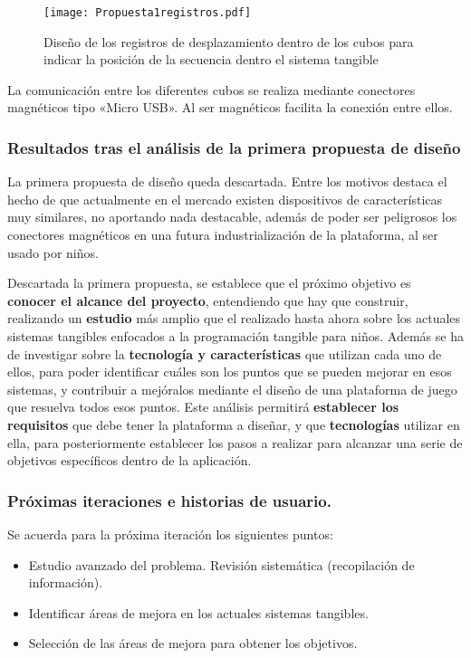 \begin{figure}[!h]
\begin{center}
\texttt{[image: Propuesta1registros.pdf]}
\caption{Diseño de los registros de desplazamiento dentro de los cubos para indicar la posición de la secuencia dentro el sistema tangible}
\label{fig:Propuesta1registros}
\end{center}
\end{figure}

La comunicación entre los diferentes cubos se realiza mediante conectores magnéticos tipo «Micro USB». Al ser magnéticos facilita la conexión entre ellos.

\subsubsection{Resultados tras el análisis de la primera propuesta de diseño}

La primera propuesta de diseño queda descartada. Entre los motivos destaca el hecho de que actualmente en el mercado existen dispositivos de características muy similares, no aportando nada destacable, además de poder ser peligrosos los conectores magnéticos en una futura industrialización de la plataforma, al ser usado por niños.

Descartada la primera propuesta, se establece que el próximo objetivo es \textbf{ conocer el alcance del proyecto}, entendiendo que hay que construir, realizando un \textbf{estudio} más amplio que el realizado hasta ahora sobre los actuales sistemas tangibles enfocados a la programación tangible para niños. Además se ha de investigar sobre la \textbf{tecnología y características} que utilizan cada uno de ellos, para poder identificar cuáles son los puntos que se pueden mejorar en esos sistemas, y contribuir a mejóralos mediante el diseño de una plataforma de juego que resuelva todos esos puntos. Este análisis permitirá \textbf{establecer los requisitos} que debe tener la plataforma a diseñar, y que \textbf{tecnologías} utilizar en ella, para posteriormente establecer los pasos a realizar para alcanzar una serie de objetivos específicos dentro de la aplicación.\

\subsubsection{Próximas iteraciones e historias de usuario.}
Se acuerda para la próxima iteración los siguientes puntos:
\begin{itemize}
\item Estudio avanzado del problema. Revisión sistemática (recopilación de información).
\item Identificar áreas de mejora en los actuales sistemas tangibles.
\item Selección de las áreas de mejora para obtener los objetivos.
\end{itemize}


